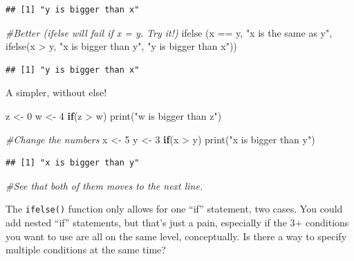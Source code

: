 \documentclass[
]{book}
\newenvironment{Shaded}{\begin{snugshade}}{\end{snugshade}}
\newcommand{\CommentTok}[1]{\textcolor[rgb]{0.56,0.35,0.01}{\textit{#1}}}
\newcommand{\ControlFlowTok}[1]{\textcolor[rgb]{0.13,0.29,0.53}{\textbf{#1}}}
\newcommand{\DecValTok}[1]{\textcolor[rgb]{0.00,0.00,0.81}{#1}}
\newcommand{\FunctionTok}[1]{\textcolor[rgb]{0.00,0.00,0.00}{#1}}
\newcommand{\NormalTok}[1]{#1}
\newcommand{\OtherTok}[1]{\textcolor[rgb]{0.56,0.35,0.01}{#1}}
\newcommand{\SpecialCharTok}[1]{\textcolor[rgb]{0.00,0.00,0.00}{#1}}
\newcommand{\StringTok}[1]{\textcolor[rgb]{0.31,0.60,0.02}{#1}}
\begin{document}
\begin{verbatim}
## [1] "y is bigger than x"
\end{verbatim}

\begin{Shaded}
\begin{Highlighting}[]
\CommentTok{\#Better (ifelse will fail if x = y.  Try it!)}
\FunctionTok{ifelse}\NormalTok{ (x }\SpecialCharTok{==}\NormalTok{ y, }\StringTok{"x is the same as y"}\NormalTok{,}
        \FunctionTok{ifelse}\NormalTok{(x }\SpecialCharTok{\textgreater{}}\NormalTok{ y, }\StringTok{"x is bigger than y"}\NormalTok{, }\StringTok{"y is bigger than x"}\NormalTok{))}
\end{Highlighting}
\end{Shaded}

\begin{verbatim}
## [1] "y is bigger than x"
\end{verbatim}

A simpler, without else!

\begin{Shaded}
\begin{Highlighting}[]
\NormalTok{z }\OtherTok{\textless{}{-}} \DecValTok{0}
\NormalTok{w }\OtherTok{\textless{}{-}} \DecValTok{4}
\ControlFlowTok{if}\NormalTok{(z }\SpecialCharTok{\textgreater{}}\NormalTok{ w) }\FunctionTok{print}\NormalTok{(}\StringTok{"w is bigger than z"}\NormalTok{)}

\CommentTok{\#Change the numbers}
\NormalTok{x }\OtherTok{\textless{}{-}} \DecValTok{5}
\NormalTok{y }\OtherTok{\textless{}{-}} \DecValTok{3}
\ControlFlowTok{if}\NormalTok{(x }\SpecialCharTok{\textgreater{}}\NormalTok{ y) }\FunctionTok{print}\NormalTok{(}\StringTok{"x is bigger than y"}\NormalTok{)}
\end{Highlighting}
\end{Shaded}

\begin{verbatim}
## [1] "x is bigger than y"
\end{verbatim}

\begin{Shaded}
\begin{Highlighting}[]
\CommentTok{\#See that both of them moves to the next line.}
\end{Highlighting}
\end{Shaded}

The \texttt{ifelse()} function only allows for one ``if'' statement, two cases. You could add nested ``if'' statements, but that's just a pain, especially if the 3+ conditions you want to use are all on the same level, conceptually. Is there a way to specify multiple conditions at the same time?
\end{document}
